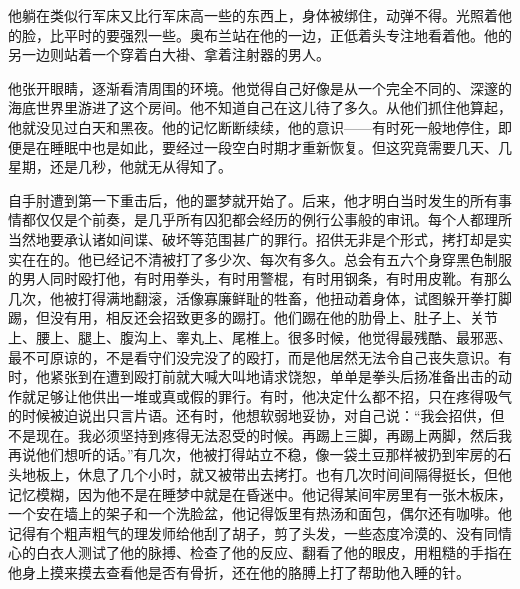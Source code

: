 他躺在类似行军床又比行军床高一些的东西上，身体被绑住，动弹不得。光照着他的脸，比平时的要强烈一些。奥布兰站在他的一边，正低着头专注地看着他。他的另一边则站着一个穿着白大褂、拿着注射器的男人。

他张开眼睛，逐渐看清周围的环境。他觉得自己好像是从一个完全不同的、深邃的海底世界里游进了这个房间。他不知道自己在这儿待了多久。从他们抓住他算起，他就没见过白天和黑夜。他的记忆断断续续，他的意识------有时死一般地停住，即便是在睡眠中也是如此，要经过一段空白时期才重新恢复。但这究竟需要几天、几星期，还是几秒，他就无从得知了。

自手肘遭到第一下重击后，他的噩梦就开始了。后来，他才明白当时发生的所有事情都仅仅是个前奏，是几乎所有囚犯都会经历的例行公事般的审讯。每个人都理所当然地要承认诸如间谍、破坏等范围甚广的罪行。招供无非是个形式，拷打却是实实在在的。他已经记不清被打了多少次、每次有多久。总会有五六个身穿黑色制服的男人同时殴打他，有时用拳头，有时用警棍，有时用钢条，有时用皮靴。有那么几次，他被打得满地翻滚，活像寡廉鲜耻的牲畜，他扭动着身体，试图躲开拳打脚踢，但没有用，相反还会招致更多的踢打。他们踢在他的肋骨上、肚子上、关节上、腰上、腿上、腹沟上、睾丸上、尾椎上。很多时候，他觉得最残酷、最邪恶、最不可原谅的，不是看守们没完没了的殴打，而是他居然无法令自己丧失意识。有时，他紧张到在遭到殴打前就大喊大叫地请求饶恕，单单是拳头后扬准备出击的动作就足够让他供出一堆或真或假的罪行。有时，他决定什么都不招，只在疼得吸气的时候被迫说出只言片语。还有时，他想软弱地妥协，对自己说：``我会招供，但不是现在。我必须坚持到疼得无法忍受的时候。再踢上三脚，再踢上两脚，然后我再说他们想听的话。''有几次，他被打得站立不稳，像一袋土豆那样被扔到牢房的石头地板上，休息了几个小时，就又被带出去拷打。也有几次时间间隔得挺长，但他记忆模糊，因为他不是在睡梦中就是在昏迷中。他记得某间牢房里有一张木板床，一个安在墙上的架子和一个洗脸盆，他记得饭里有热汤和面包，偶尔还有咖啡。他记得有个粗声粗气的理发师给他刮了胡子，剪了头发，一些态度冷漠的、没有同情心的白衣人测试了他的脉搏、检查了他的反应、翻看了他的眼皮，用粗糙的手指在他身上摸来摸去查看他是否有骨折，还在他的胳膊上打了帮助他入睡的针。

